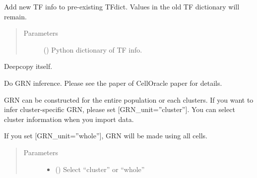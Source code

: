 \documentclass[letterpaper,10pt,english]{sphinxmanual}
\begin{document}
\begin{fulllineitems}
\begin{fulllineitems}
\end{fulllineitems}


\begin{fulllineitems}
\label{\detokenize{modules/celloracle:celloracle.Oracle.addTFinfo_dictionary}}
Add new TF info to pre-existing TFdict.
Values in the old TF dictionary will remain.
\begin{quote}\begin{description}
\item[{Parameters}] \leavevmode
{} () \textendash{} Python dictionary of TF info.

\end{description}\end{quote}

\end{fulllineitems}


\begin{fulllineitems}
\label{\detokenize{modules/celloracle:celloracle.Oracle.copy}}
Deepcopy itself.

\end{fulllineitems}


\begin{fulllineitems}
\label{\detokenize{modules/celloracle:celloracle.Oracle.fit_GRN_for_simulation}}
Do GRN inference.
Please see the paper of CellOracle paper for details.

GRN can be constructed for the entire population or each clusters.
If you want to infer cluster-specific GRN, please set {[}GRN\_unit=”cluster”{]}.
You can select cluster information when you import data.

If you set {[}GRN\_unit=”whole”{]}, GRN will be made using all cells.
\begin{quote}\begin{description}
\item[{Parameters}] \leavevmode\begin{itemize}
\item {} 
 () \textendash{} Select “cluster” or “whole”


\end{itemize}
\end{description}
\end{quote}
\end{fulllineitems}
\end{fulllineitems}
\end{document}
